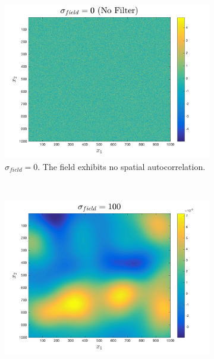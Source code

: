 \begin{figure}[ht!]
    \centering
    \begin{subfigure}[t]{0.33333\textwidth}
        \centering
        \includegraphics[width=\linewidth]{figures/autocorr_sigma_0.png}
        \captionsetup{skip=0.25\baselineskip,size=footnotesize}
        \ssp
        \caption{$\sigma_{field} = 0$. The field exhibits no spatial autocorrelation.}
    \end{subfigure}%
    ~
    \begin{subfigure}[t]{0.33333\textwidth}
        \centering
        \includegraphics[width=\linewidth]{figures/autocorr_sigma_100.png}
        \captionsetup{skip=0.25\baselineskip,size=footnotesize}
        \ssp

\end{subfigure}
\end{figure}
